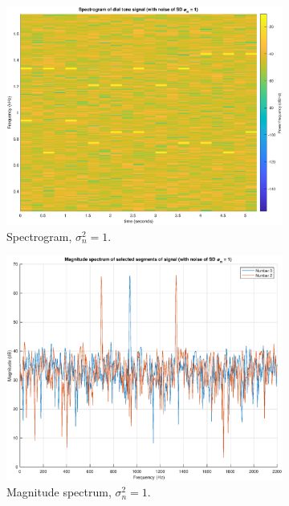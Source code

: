 \begin{figure}[H]
\begin{subfigure}{.32\textwidth}
  \includegraphics[width=\linewidth]{assignment3figs/spec_sd1.eps}  
  \caption{Spectrogram, $\sigma_{n}^{2} = 1$.}
\end{subfigure}
\begin{subfigure}{.32\textwidth}
  \centering
  \includegraphics[width=\linewidth]{assignment3figs/magspec_sd1.eps}  
  \caption{Magnitude spectrum, $\sigma_{n}^{2} = 1$.}
\end{subfigure}\\
\begin{subfigure}{.32\textwidth}
  \centering

\end{subfigure}
\end{figure}

